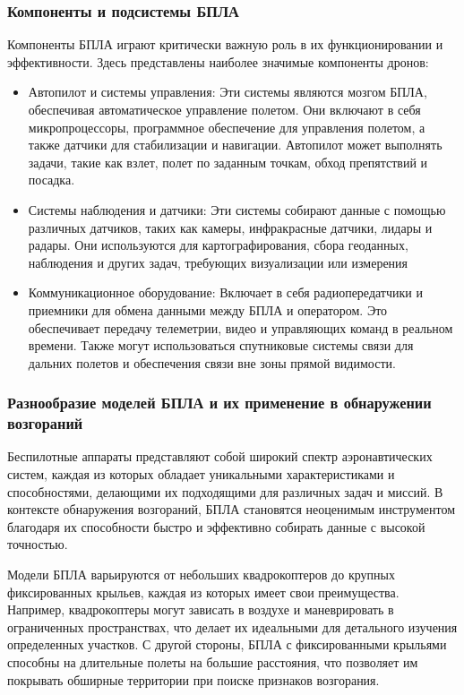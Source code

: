 \subsubsection{Компоненты и подсистемы БПЛА}
Компоненты БПЛА играют критически важную роль в их функционировании и эффективности. Здесь представлены наиболее значимые компоненты дронов:
\begin{itemize}
	\item Автопилот и системы управления: Эти системы являются мозгом БПЛА, обеспечивая автоматическое управление полетом. Они включают в себя микропроцессоры, программное обеспечение для управления полетом, а также датчики для стабилизации и навигации. Автопилот может выполнять задачи, такие как взлет, полет по заданным точкам, обход препятствий и посадка.
	\item Системы наблюдения и датчики: Эти системы собирают данные с помощью различных датчиков, таких как камеры, инфракрасные датчики, лидары и радары. Они используются для картографирования, сбора геоданных, наблюдения и других задач, требующих визуализации или измерения
	\item Коммуникационное оборудование: Включает в себя радиопередатчики и приемники для обмена данными между БПЛА и оператором. Это обеспечивает передачу телеметрии, видео и управляющих команд в реальном времени. Также могут использоваться спутниковые системы связи для дальних полетов и обеспечения связи вне зоны прямой видимости.
\end{itemize}

\subsubsection{Разнообразие моделей БПЛА и их применение в обнаружении возгораний}
Беспилотные аппараты представляют собой широкий спектр аэронавтических систем, каждая из которых обладает уникальными характеристиками и способностями, делающими их подходящими для различных задач и миссий. В контексте обнаружения возгораний, БПЛА становятся неоценимым инструментом благодаря их способности быстро и эффективно собирать данные с высокой точностью.

Модели БПЛА варьируются от небольших квадрокоптеров до крупных фиксированных крыльев, каждая из которых имеет свои преимущества. Например, квадрокоптеры могут зависать в воздухе и маневрировать в ограниченных пространствах, что делает их идеальными для детального изучения определенных участков. С другой стороны, БПЛА с фиксированными крыльями способны на длительные полеты на большие расстояния, что позволяет им покрывать обширные территории при поиске признаков возгорания.

